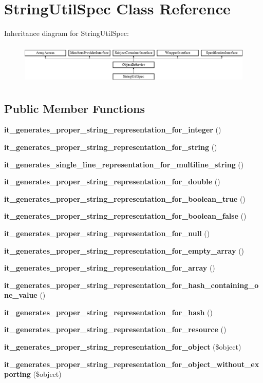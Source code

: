 \section{String\+Util\+Spec Class Reference}
\label{classspec_1_1_prophecy_1_1_util_1_1_string_util_spec}
Inheritance diagram for String\+Util\+Spec\+:\begin{figure}[H]
\begin{center}
\leavevmode
\includegraphics[height=1.953488cm]{classspec_1_1_prophecy_1_1_util_1_1_string_util_spec}
\end{center}
\end{figure}
\subsection*{Public Member Functions}
\begin{DoxyCompactItemize}
\item 
{\bf it\+\_\+generates\+\_\+proper\+\_\+string\+\_\+representation\+\_\+for\+\_\+integer} ()
\item 
{\bf it\+\_\+generates\+\_\+proper\+\_\+string\+\_\+representation\+\_\+for\+\_\+string} ()
\item 
{\bf it\+\_\+generates\+\_\+single\+\_\+line\+\_\+representation\+\_\+for\+\_\+multiline\+\_\+string} ()
\item 
{\bf it\+\_\+generates\+\_\+proper\+\_\+string\+\_\+representation\+\_\+for\+\_\+double} ()
\item 
{\bf it\+\_\+generates\+\_\+proper\+\_\+string\+\_\+representation\+\_\+for\+\_\+boolean\+\_\+true} ()
\item 
{\bf it\+\_\+generates\+\_\+proper\+\_\+string\+\_\+representation\+\_\+for\+\_\+boolean\+\_\+false} ()
\item 
{\bf it\+\_\+generates\+\_\+proper\+\_\+string\+\_\+representation\+\_\+for\+\_\+null} ()
\item 
{\bf it\+\_\+generates\+\_\+proper\+\_\+string\+\_\+representation\+\_\+for\+\_\+empty\+\_\+array} ()
\item 
{\bf it\+\_\+generates\+\_\+proper\+\_\+string\+\_\+representation\+\_\+for\+\_\+array} ()
\item 
{\bf it\+\_\+generates\+\_\+proper\+\_\+string\+\_\+representation\+\_\+for\+\_\+hash\+\_\+containing\+\_\+one\+\_\+value} ()
\item 
{\bf it\+\_\+generates\+\_\+proper\+\_\+string\+\_\+representation\+\_\+for\+\_\+hash} ()
\item 
{\bf it\+\_\+generates\+\_\+proper\+\_\+string\+\_\+representation\+\_\+for\+\_\+resource} ()
\item 
{\bf it\+\_\+generates\+\_\+proper\+\_\+string\+\_\+representation\+\_\+for\+\_\+object} (\$object)
\item 
{\bf it\+\_\+generates\+\_\+proper\+\_\+string\+\_\+representation\+\_\+for\+\_\+object\+\_\+without\+\_\+exporting} (\$object)
\end{DoxyCompactItemize}
